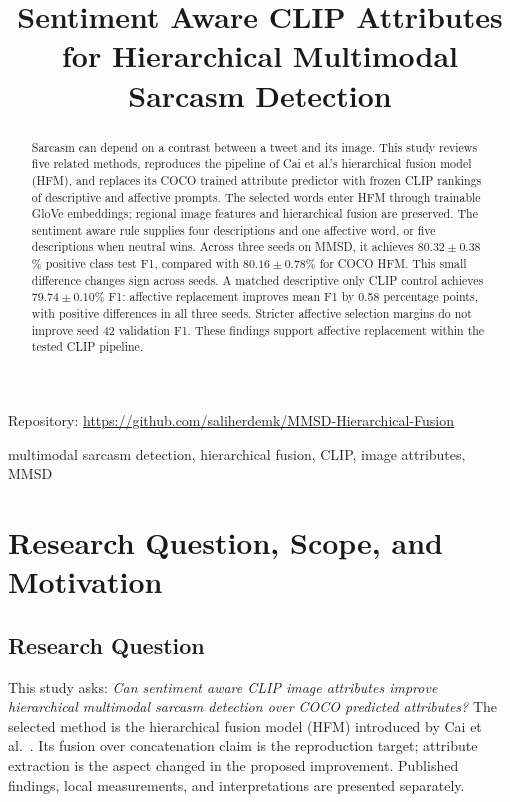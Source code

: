 \documentclass[conference]{IEEEtran}
\begin{document}
\title{Sentiment Aware CLIP Attributes for Hierarchical Multimodal Sarcasm Detection}
\author{
}
\maketitle
\pagestyle{plain}
\thispagestyle{plain}
\begin{center}
\footnotesize Repository: \url{https://github.com/saliherdemk/MMSD-Hierarchical-Fusion}
\end{center}

\begin{abstract}
Sarcasm can depend on a contrast between a tweet and its image. This study reviews five related methods, reproduces the pipeline of Cai et al.'s hierarchical fusion model (HFM), and replaces its COCO trained attribute predictor with frozen CLIP rankings of descriptive and affective prompts. The selected words enter HFM through trainable GloVe embeddings; regional image features and hierarchical fusion are preserved. The sentiment aware rule supplies four descriptions and one affective word, or five descriptions when neutral wins. Across three seeds on MMSD, it achieves $80.32\pm0.38$\% positive class test F1, compared with $80.16\pm0.78$\% for COCO HFM. This small difference changes sign across seeds. A matched descriptive only CLIP control achieves $79.74\pm0.10$\% F1: affective replacement improves mean F1 by 0.58 percentage points, with positive differences in all three seeds. Stricter affective selection margins do not improve seed 42 validation F1. These findings support affective replacement within the tested CLIP pipeline.
\end{abstract}

\begin{IEEEkeywords}
multimodal sarcasm detection, hierarchical fusion, CLIP, image attributes, MMSD
\end{IEEEkeywords}

\section{Research Question, Scope, and Motivation}
\subsection{Research Question}
This study asks: \emph{Can sentiment aware CLIP image attributes improve hierarchical multimodal sarcasm detection over COCO predicted attributes?} The selected method is the hierarchical fusion model (HFM) introduced by Cai et al.~\cite{cai2019}. Its fusion over concatenation claim is the reproduction target; attribute extraction is the aspect changed in the proposed improvement. Published findings, local measurements, and interpretations are presented separately.
\end{document}
